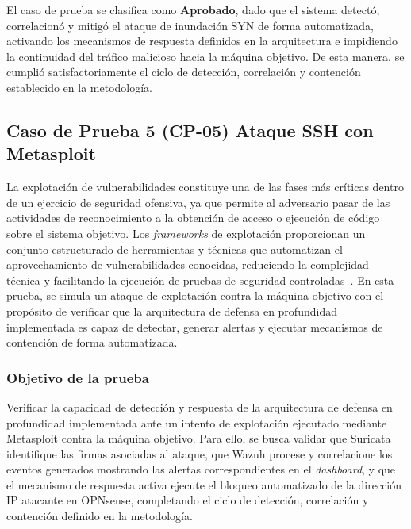 El caso de prueba se clasifica como \textbf{Aprobado}, dado que el sistema detectó, correlacionó y mitigó el ataque de inundación SYN de 
forma automatizada, activando los mecanismos de respuesta definidos en la arquitectura e impidiendo la continuidad del tráfico malicioso 
hacia la máquina objetivo. De esta manera, se cumplió satisfactoriamente el ciclo de detección, correlación y contención establecido en 
la metodología.


\subsection{Caso de Prueba 5 (CP-05) Ataque SSH con Metasploit}
\noindent

La explotación de vulnerabilidades constituye una de las fases más críticas dentro de un ejercicio de seguridad ofensiva, ya que permite 
al adversario pasar de las actividades de reconocimiento a la obtención de acceso o ejecución de código sobre el sistema objetivo. Los 
\textit{frameworks} de explotación proporcionan un conjunto estructurado de herramientas y técnicas que automatizan el aprovechamiento de 
vulnerabilidades conocidas, reduciendo la complejidad técnica y facilitando la ejecución de pruebas de seguridad 
controladas~\cite{MITREATTACK2026, MetasploitDocs}. En esta prueba, se simula un ataque de explotación contra la máquina objetivo con el 
propósito de verificar que la arquitectura de defensa en profundidad implementada es capaz de detectar, generar alertas y ejecutar 
mecanismos de contención de forma automatizada.

\subsubsection{Objetivo de la prueba}
\noindent

Verificar la capacidad de detección y respuesta de la arquitectura de defensa en profundidad implementada ante un intento de 
explotación ejecutado mediante Metasploit contra la máquina objetivo. Para ello, se busca validar que Suricata identifique las firmas 
asociadas al ataque, que Wazuh procese y correlacione los eventos generados mostrando las alertas correspondientes en el 
\textit{dashboard}, y que el mecanismo de respuesta activa ejecute el bloqueo automatizado de la dirección IP atacante en OPNsense, 
completando el ciclo de detección, correlación y contención definido en la metodología.

